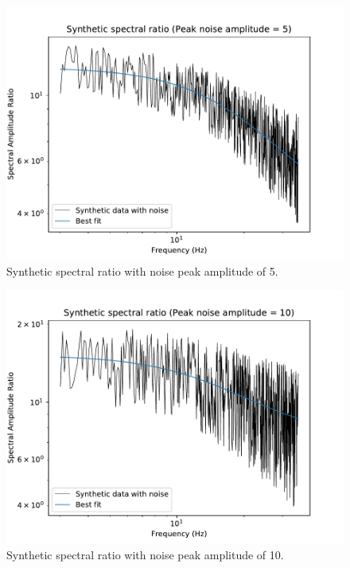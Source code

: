 \documentclass[11pt]{article}
\begin{document}
\begin{figure}[!htb]
    \centering
    \includegraphics[scale=0.7]{fig_mom_noise_1.pdf}
    \caption{Synthetic spectral ratio with noise peak amplitude of 5.}
\end{figure}
\begin{figure}[!htb]
    \centering
    \includegraphics[scale=0.7]{fig_mom_noise_2.pdf}
    \caption{Synthetic spectral ratio with noise peak amplitude of 10.}
\end{figure}
\end{document}
